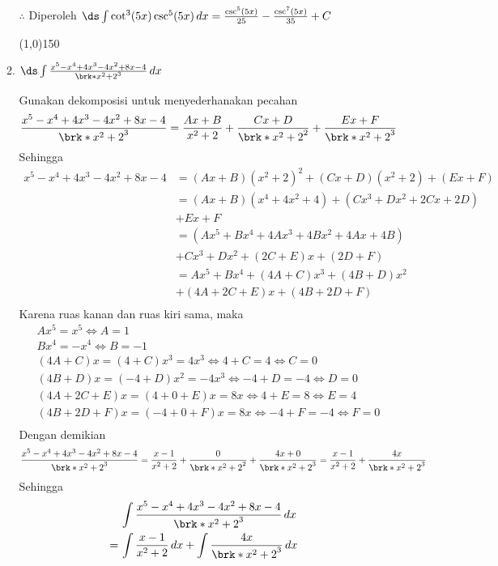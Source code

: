 \begin{enumerate}[leftmargin=*, label={\arabic*}.]
\begin{enumerate}[label={\alph*}.]
    $\therefore$ Diperoleh $\ds \int \cot^{3}(5x)\csc^{5}(5x)\,dx
    =\frac{\csc^{5}(5x)}{25}-\frac{\csc^{7}(5x)}{35}+C$
\begin{center}
    \line(1,0){150}
\end{center}
    \item $\ds \int \frac{x^{5}-x^{4}+4x^{3}-4x^{2}+8x-4}{\brk*{x^{2}+2}^{3}}\,dx$
    
    Gunakan dekomposisi untuk menyederhanakan pecahan
    \[
        \frac{x^{5}-x^{4}+4x^{3}-4x^{2}+8x-4}{\brk*{x^{2}+2}^{3}} 
        = \frac{Ax+B}{x^{2}+2} + \frac{Cx+D}{\brk*{x^{2}+2}^{2}} 
        + \frac{Ex+F}{\brk*{x^{2}+2}^{3}}
    \]
    Sehingga
    \begin{align*}
        x^{5}-x^{4}+4x^{3}-4x^{2}+8x-4&=(Ax+B)(x^{2}+2)^{2}+(Cx+D)(x^{2}+2)+(Ex+F)\\
        &=(Ax+B)(x^{4}+4x^{2}+4)+(Cx^{3}+Dx^{2}+2Cx+2D) \\
        &+ Ex+F\\
        &=(Ax^{5}+Bx^{4}+4Ax^{3}+4Bx^{2}+4Ax+4B)\\
        &+Cx^{3}+Dx^{2}+(2C+E)x+(2D+F) \\
        &=Ax^{5}+Bx^{4}+(4A+C)x^{3}+(4B+D)x^{2}\\
        &+(4A+2C+E)x+(4B+2D+F) \\
    \end{align*}
    Karena ruas kanan dan ruas kiri sama, maka
    \begin{align*}
        &Ax^{5} =x^{5} \iff A = 1\\
        &Bx^{4} = -x^{4} \iff B = -1\\
        &(4A+C)x=(4+C)x^{3}=4x^{3} \iff 4+C = 4 \iff C=0\\ 
        &(4B+D)x=(-4+D)x^{2}=-4x^{3} \iff -4+D = -4 \iff D=0\\ 
        &(4A+2C+E)x=(4+0+E)x=8x \iff 4+E = 8 \iff E=4\\ 
        &(4B+2D+F)x=(-4+0+F)x=8x \iff -4+F = -4 \iff F=0\\ 
    \end{align*}
    Dengan demikian
    \[
        \frac{x^{5}-x^{4}+4x^{3}-4x^{2}+8x-4}{\brk*{x^{2}+2}^{3}} 
        = \frac{x-1}{x^{2}+2} + \frac{0}{\brk*{x^{2}+2}^{2}} 
        + \frac{4x+0}{\brk*{x^{2}+2}^{3}}
        = \frac{x-1}{x^{2}+2} + \frac{4x}{\brk*{x^{2}+2}^{3}}
    \]
    Sehingga
    \begin{align*}
        &\int \frac{x^{5}-x^{4}+4x^{3}-4x^{2}+8x-4}{\brk*{x^{2}+2}^{3}}\,dx\\
        =\,&\int \frac{x-1}{x^{2}+2}\,dx + \int \frac{4x}{\brk*{x^{2}+2}^{3}}\,dx\\

\end{align*}
\end{enumerate}
\end{enumerate}
